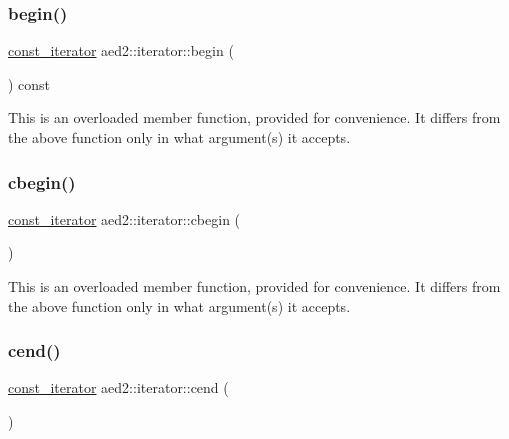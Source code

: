 \subsubsection{\texorpdfstring{begin()}{begin()}\hspace{0.1cm}{\footnotesize\ttfamily [2/2]}}
{\footnotesize\ttfamily \hyperlink{classaed2_1_1iterator_1_1const__iterator}{const\+\_\+iterator} aed2\+::iterator\+::begin (\begin{DoxyParamCaption}{ }\end{DoxyParamCaption}) const\hspace{0.3cm}{\ttfamily [inline]}}

This is an overloaded member function, provided for convenience. It differs from the above function only in what argument(s) it accepts. \mbox{\label{classaed2_1_1iterator_a89cca73bd2e4df39de7c412c441d6da1}} 
\subsubsection{\texorpdfstring{cbegin()}{cbegin()}}
{\footnotesize\ttfamily \hyperlink{classaed2_1_1iterator_1_1const__iterator}{const\+\_\+iterator} aed2\+::iterator\+::cbegin (\begin{DoxyParamCaption}{ }\end{DoxyParamCaption})\hspace{0.3cm}{\ttfamily [inline]}}

This is an overloaded member function, provided for convenience. It differs from the above function only in what argument(s) it accepts. \mbox{\label{classaed2_1_1iterator_a2d0d226485d9280d16a739d0b9dae525}} 
\subsubsection{\texorpdfstring{cend()}{cend()}}
{\footnotesize\ttfamily \hyperlink{classaed2_1_1iterator_1_1const__iterator}{const\+\_\+iterator} aed2\+::iterator\+::cend (\begin{DoxyParamCaption}{ }\end{DoxyParamCaption})\hspace{0.3cm}{\ttfamily [inline]}}

